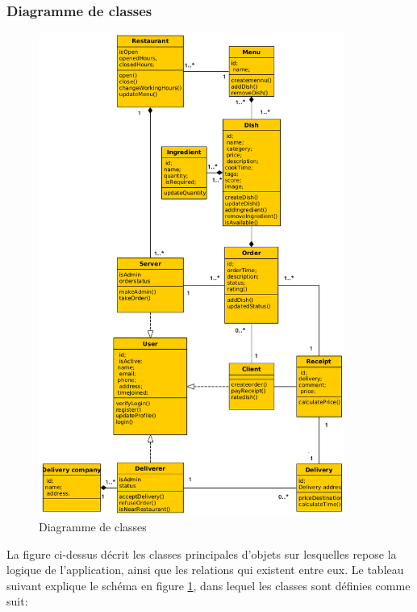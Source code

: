 \documentclass[french, a4paper, 12pt]{report}
\begin{document}
		\subsubsection{Diagramme de classes}
			\begin{figure}[!h]
  				\center
  				\includegraphics[width=10cm]{classdiag.png}
  				\caption{Diagramme de classes}
  				\label{fig:classdiag}
			\end{figure}
			
			La figure ci-dessus décrit les classes principales d'objets sur lesquelles repose la logique de l'application, ainsi que les relations qui existent entre eux.
			\newpage
			Le tableau suivant explique le schéma en figure \ref{fig:classdiag}, dans lequel les classes sont définies comme suit:
			
\end{document}
